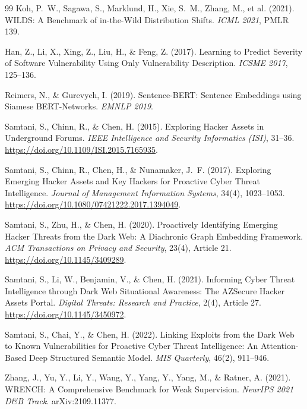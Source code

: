 \documentclass{article}
\begin{document}
\begin{thebibliography}{99}
Koh, P.\ W., Sagawa, S., Marklund, H., Xie, S.\ M., Zhang, M.,
et al. (2021). WILDS: A Benchmark of in-the-Wild Distribution Shifts.
\textit{ICML 2021}, PMLR 139.

Han, Z., Li, X., Xing, Z., Liu, H., \& Feng, Z. (2017).
Learning to Predict Severity of Software Vulnerability Using Only
Vulnerability Description. \textit{ICSME 2017}, 125--136.

Reimers, N., \& Gurevych, I. (2019). Sentence-BERT:
Sentence Embeddings using Siamese BERT-Networks. \textit{EMNLP 2019}.

Samtani, S., Chinn, R., \& Chen, H. (2015).
Exploring Hacker Assets in Underground Forums.
\textit{IEEE Intelligence and Security Informatics (ISI)}, 31--36.
\url{https://doi.org/10.1109/ISI.2015.7165935}.

Samtani, S., Chinn, R., Chen, H., \& Nunamaker, J.\ F. (2017).
Exploring Emerging Hacker Assets and Key Hackers for Proactive Cyber
Threat Intelligence. \textit{Journal of Management Information Systems},
34(4), 1023--1053. \url{https://doi.org/10.1080/07421222.2017.1394049}.

Samtani, S., Zhu, H., \& Chen, H. (2020).
Proactively Identifying Emerging Hacker Threats from the Dark Web: A
Diachronic Graph Embedding Framework. \textit{ACM Transactions on Privacy
and Security}, 23(4), Article 21. \url{https://doi.org/10.1145/3409289}.

Samtani, S., Li, W., Benjamin, V., \& Chen, H. (2021).
Informing Cyber Threat Intelligence through Dark Web Situational
Awareness: The AZSecure Hacker Assets Portal. \textit{Digital Threats:
Research and Practice}, 2(4), Article 27.
\url{https://doi.org/10.1145/3450972}.

Samtani, S., Chai, Y., \& Chen, H. (2022).
Linking Exploits from the Dark Web to Known Vulnerabilities for Proactive
Cyber Threat Intelligence: An Attention-Based Deep Structured Semantic
Model. \textit{MIS Quarterly}, 46(2), 911--946.

Zhang, J., Yu, Y., Li, Y., Wang, Y., Yang, Y., Yang, M., \&
Ratner, A. (2021). WRENCH: A Comprehensive Benchmark for Weak
Supervision. \textit{NeurIPS 2021 D\&B Track}. arXiv:2109.11377.


\end{thebibliography}
\end{document}

